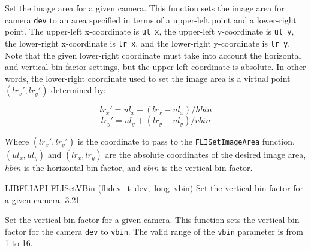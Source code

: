 \documentclass{article}
\begin{document}
\begin{cxxentry}
\begin{cxxfunction}
\begin{cxxdoc}
Set the image area for a given camera.  This function sets the
image area for camera \texttt{dev} to an area specified in terms of
a upper-left point and a lower-right point.  The upper-left
x-coordinate is \texttt{ul\_x}, the upper-left y-coordinate is
\texttt{ul\_y}, the lower-right x-coordinate is \texttt{lr\_x}, and
the lower-right y-coordinate is \texttt{lr\_y}.  Note that the given
lower-right coordinate must take into account the horizontal and
vertical bin factor settings, but the upper-left coordinate is
absolute.  In other words, the lower-right coordinate used to set
the image area is a virtual point $(lr_x', lr_y')$ determined by:

\[ lr_x' = ul_x + (lr_x - ul_x) / hbin \]
\[ lr_y' = ul_y + (lr_y - ul_y) / vbin \]

Where $(lr_x', lr_y')$ is the coordinate to pass to the
\texttt{FLISetImageArea} function, $(ul_x, ul_y)$ and $(lr_x,
lr_y)$ are the absolute coordinates of the desired image area,
$hbin$ is the horizontal bin factor, and $vbin$ is the vertical bin
factor.


\end{cxxdoc}
\end{cxxfunction}
\begin{cxxfunction}
{LIBFLIAPI}
        {FLISetVBin}
        {(flidev\_t\ dev,\ long\ vbin)}
        { Set the vertical bin factor for a given camera.}
        {3.21}
\begin{cxxdoc}

Set the vertical bin factor for a given camera.  This function sets
the vertical bin factor for the camera \texttt{dev} to
\texttt{vbin}.  The valid range of the \texttt{vbin} parameter is
from 1 to 16.



\end{cxxdoc}
\end{cxxfunction}
\end{cxxentry}
\end{document}
